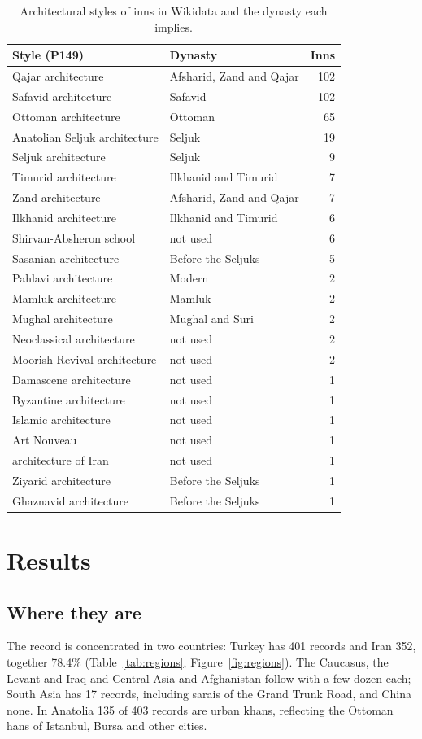 \documentclass[11pt,a4paper]{article}
\begin{document}
\begin{table}[tbp]\centering\small\caption{Architectural styles of inns in Wikidata and the dynasty each implies.}\label{tab:styles}\begin{tabular}{llr}\toprule Style (P149) & Dynasty & Inns\\\midrule
Qajar architecture & Afsharid, Zand and Qajar & 102\\
Safavid architecture & Safavid & 102\\
Ottoman architecture & Ottoman & 65\\
Anatolian Seljuk architecture & Seljuk & 19\\
Seljuk architecture & Seljuk & 9\\
Timurid architecture & Ilkhanid and Timurid & 7\\
Zand architecture & Afsharid, Zand and Qajar & 7\\
Ilkhanid architecture & Ilkhanid and Timurid & 6\\
Shirvan-Absheron school & not used & 6\\
Sasanian architecture & Before the Seljuks & 5\\
Pahlavi architecture & Modern & 2\\
Mamluk architecture & Mamluk & 2\\
Mughal architecture & Mughal and Suri & 2\\
Neoclassical architecture & not used & 2\\
Moorish Revival architecture & not used & 2\\
Damascene architecture & not used & 1\\
Byzantine architecture & not used & 1\\
Islamic architecture & not used & 1\\
Art Nouveau & not used & 1\\
architecture of Iran & not used & 1\\
Ziyarid architecture & Before the Seljuks & 1\\
Ghaznavid architecture & Before the Seljuks & 1\\
\bottomrule\end{tabular}\end{table}

\section{Results}
\subsection{Where they are}
The record is concentrated in two countries: Turkey has 401 records and Iran 352, together 78.4\% (Table~\ref{tab:regions}, Figure~\ref{fig:regions}). The Caucasus, the Levant and Iraq and Central Asia and Afghanistan follow with a few dozen each; South Asia has 17 records, including sarais of the Grand Trunk Road, and China none. In Anatolia 135 of 403 records are urban khans, reflecting the Ottoman hans of Istanbul, Bursa and other cities.
\end{document}

